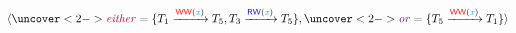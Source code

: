 \begin{frame}{}
	\vspace{-0.50cm}
	\[\tuple{
		\uncover<2->{\purple{\eithervar} = \set{T_{1} \rel{\WW(\keyxvar)} T_{5},
			T_{3} \rel{\RW(\keyxvar)} T_{5}}},
		\uncover<2->{\violet{\orvar} = \set{T_{5} \rel{\WW(\keyxvar)} T_{1}}}
	}\]

	\vspace{-0.30cm}
	\begin{center}
		\resizebox{0.80\textwidth}{!}{}
	\end{center}
	\vspace{-0.80cm}

\end{frame}






